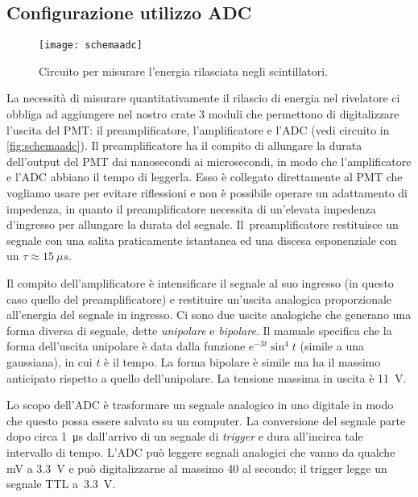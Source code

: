 
\subsection{Configurazione utilizzo ADC}

\begin{figure}
	\centering
	\texttt{[image: schemaadc]}
	\caption{\label{fig:schemaadc}
	Circuito per misurare l'energia rilasciata negli scintillatori.}
\end{figure}

La necessità di misurare quantitativamente il rilascio di energia nel rivelatore ci obbliga ad aggiungere nel nostro crate 3 moduli che permettono di digitalizzare l'uscita del PMT: il preamplificatore, l'amplificatore e l'ADC
(vedi circuito in \autoref{fig:schemaadc}).
Il preamplificatore ha il compito di allungare la durata dell'output del PMT dai nanosecondi ai microsecondi, in modo che l'amplificatore e l'ADC abbiano il tempo di leggerla. Esso è collegato direttamente al PMT che vogliamo usare per evitare riflessioni e non è possibile operare un adattamento di impedenza, in quanto il preamplificatore necessita di un'elevata impedenza d'ingresso per allungare la durata del segnale. 
Il~preamplificatore restituisce un segnale con una salita praticamente istantanea
ed una discesa esponenziale con un $\tau\approx\SI{15}{\mu s}$.

Il compito dell'amplificatore è intensificare il segnale al suo ingresso
(in questo caso quello del preamplificatore)
e restituire un'uscita analogica proporzionale all'energia del segnale in ingresso.
Ci sono due uscite analogiche che generano una forma diversa di segnale,
dette \emph{unipolare} e \emph{bipolare}.
Il manuale specifica che la forma dell'uscita unipolare
è data dalla funzione $e^{-3t}\sin^4{t}$ (simile a una gaussiana), in cui $t$ è il tempo.
La forma bipolare è simile ma ha il massimo anticipato rispetto a quello dell'unipolare.
La tensione massima in uscita è \SI{11}{V}.

Lo scopo dell'ADC è trasformare un segnale analogico in uno digitale
in modo che questo possa essere salvato su un computer.  
La conversione del segnale parte dopo circa \SI{1}{\micro s} dall'arrivo di un segnale di \emph{trigger} e dura all'incirca tale intervallo di tempo. L'ADC può leggere segnali analogici che vanno da qualche \si{mV} a \SI{3.3}{V} e può digitalizzarne al massimo 40 al secondo;
il trigger legge un segnale TTL a~\SI{3.3}{V}.

